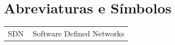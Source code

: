 \chapter*{Abreviaturas e Símbolos}
\begin{flushleft}
\begin{tabular}{l p{0.8\linewidth}}
SDN       & Software Defined Networks\\
\end{tabular}
\end{flushleft}

